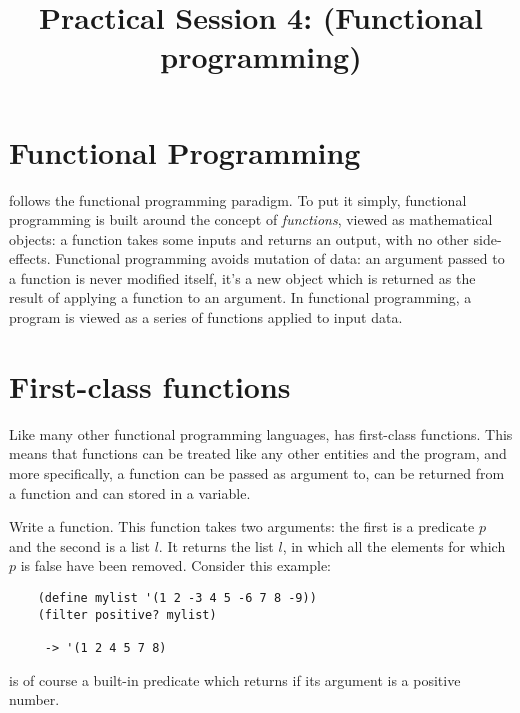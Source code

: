 \documentclass{../../../tp}
\title{Practical Session 4: \scheme (Functional programming)}
\author{}
\begin{document}
	
	\maketitle



\section{Functional Programming}

\scheme follows the functional programming paradigm. To put it simply, functional programming is built around the concept of \emph{functions}, viewed as mathematical objects: a function takes some inputs and returns an output, with no other side-effects. Functional programming avoids mutation of data: an argument passed to a function is never modified itself, it's a new object which is returned as the result of applying a function to an argument. In functional programming, a program is viewed as a series of functions applied to input data.

\section{First-class functions}

Like many other functional programming languages, \scheme has first-class functions. This means that functions can be treated like any other entities and the program, and more specifically, a function can be passed as argument to, can be returned from a function and can stored in a variable.

\begin{instruction}
	Write a  function. This function takes two arguments: the first is a predicate $p$ and the second is a list $l$. It returns the list $l$, in which all the elements for which $p$ is false have been removed. Consider this example:

\begin{verbatim}
	(define mylist '(1 2 -3 4 5 -6 7 8 -9))
	(filter positive? mylist)
	 
	 -> '(1 2 4 5 7 8)
\end{verbatim}

 is of course a built-in \scheme predicate which returns  if its argument is a positive number. 
\end{instruction}
\end{document}
